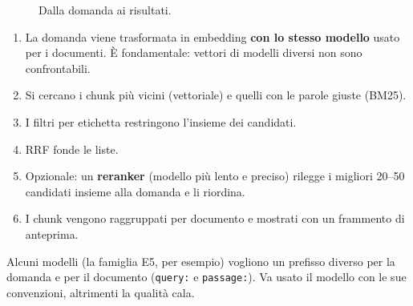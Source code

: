 \documentclass[11pt,a4paper]{article}
\newcommand{\code}[1]{\texttt{\small #1}}
\begin{document}
\begin{figure}[h]
\centering
{}
\caption{Dalla domanda ai risultati.}
\end{figure}

\begin{enumerate}
  \item La domanda viene trasformata in embedding \textbf{con lo stesso modello} usato per i documenti. È fondamentale: vettori di modelli diversi non sono confrontabili.
  \item Si cercano i chunk più vicini (vettoriale) e quelli con le parole giuste (BM25).
  \item I filtri per etichetta restringono l'insieme dei candidati.
  \item RRF fonde le liste.
  \item Opzionale: un \textbf{reranker} (modello più lento e preciso) rilegge i migliori 20--50 candidati insieme alla domanda e li riordina.
  \item I chunk vengono raggruppati per documento e mostrati con un frammento di anteprima.
\end{enumerate}

\begin{nota}
Alcuni modelli (la famiglia E5, per esempio) vogliono un prefisso diverso per la domanda e per il documento (\code{query:} e \code{passage:}). Va usato il modello con le sue convenzioni, altrimenti la qualità cala.
\end{nota}
\end{document}
